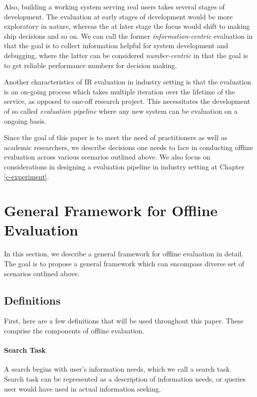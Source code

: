 \documentclass[openany]{now} %
\begin{document}
Also, building a working system serving real users takes several stages of development. The evaluation at early stages of development would be more exploratory in nature, whereas the at later stage the focus would shift to making ship decisions and so on. We can call the former \textit{information-centric} evaluation in that the goal is to collect information helpful for system development and debugging, where the latter can be considered \textit{number-centric} in that the goal is to get reliable performance numbers for decision making.

Another characteristics of IR evaluation in industry setting is that the evaluation is an on-going process which takes multiple iteration over the lifetime of the service, as opposed to one-off research project. This necessitates the development of so called \textit{evaluation pipeline} where any new system can be evaluation on a ongoing basis.  

Since the goal of this paper is to meet the need of practitioners as well as academic researchers, we describe decisions one needs to face in conducting offline evaluation across various scenarios outlined above. We also focus on considerations in designing a evaluation pipeline in industry setting at Chapter \ref{c-experiment}.

\section{General Framework for Offline Evaluation}

In this section, we describe a general framework for offline evaluation in detail. The goal is to propose a general framework which can encompass diverse set of scenarios outlined above. 

\subsection{Definitions}

First, here are a few definitions that will be used throughout this paper. These comprise the components of offline evaluation.

\paragraph{Search Task} A search begins with user's information needs, which we call a search task. Search task can be represented as a description of information needs, or queries user would have used in actual information seeking.
\end{document}
